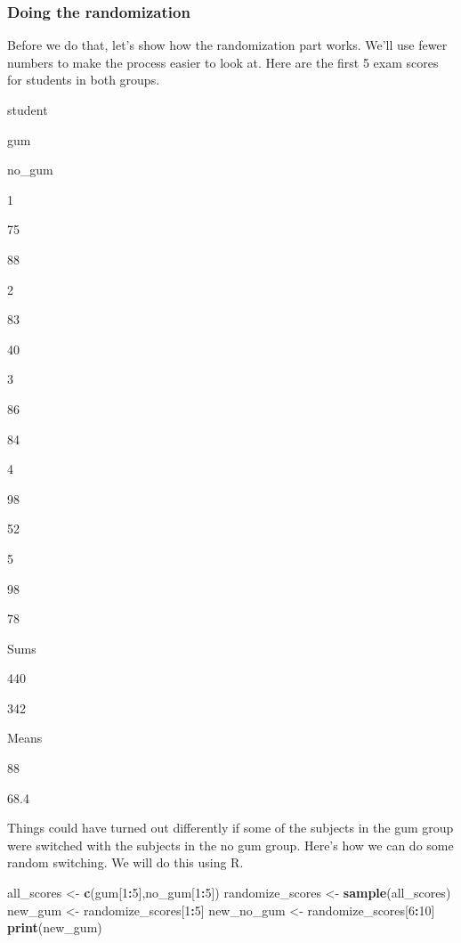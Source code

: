 \documentclass[
]{book}
\newenvironment{Shaded}{\begin{snugshade}}{\end{snugshade}}
\newcommand{\DecValTok}[1]{\textcolor[rgb]{0.00,0.00,0.81}{#1}}
\newcommand{\KeywordTok}[1]{\textcolor[rgb]{0.13,0.29,0.53}{\textbf{#1}}}
\newcommand{\NormalTok}[1]{#1}
\newcommand{\OperatorTok}[1]{\textcolor[rgb]{0.81,0.36,0.00}{\textbf{#1}}}
\newcommand{\StringTok}[1]{\textcolor[rgb]{0.31,0.60,0.02}{#1}}
\begin{document}
\hypertarget{doing-the-randomization}{%
\subsubsection{Doing the randomization}\label{doing-the-randomization}}

Before we do that, let's show how the randomization part works. We'll use fewer numbers to make the process easier to look at. Here are the first 5 exam scores for students in both groups.

student

gum

no\_gum

1

75

88

2

83

40

3

86

84

4

98

52

5

98

78

Sums

440

342

Means

88

68.4

Things could have turned out differently if some of the subjects in the gum group were switched with the subjects in the no gum group. Here's how we can do some random switching. We will do this using R.

\begin{Shaded}
\begin{Highlighting}[]
\NormalTok{all_scores       <-}\StringTok{ }\KeywordTok{c}\NormalTok{(gum[}\DecValTok{1}\OperatorTok{:}\DecValTok{5}\NormalTok{],no_gum[}\DecValTok{1}\OperatorTok{:}\DecValTok{5}\NormalTok{])}
\NormalTok{randomize_scores <-}\StringTok{ }\KeywordTok{sample}\NormalTok{(all_scores)}
\NormalTok{new_gum          <-}\StringTok{ }\NormalTok{randomize_scores[}\DecValTok{1}\OperatorTok{:}\DecValTok{5}\NormalTok{]}
\NormalTok{new_no_gum       <-}\StringTok{ }\NormalTok{randomize_scores[}\DecValTok{6}\OperatorTok{:}\DecValTok{10}\NormalTok{]}
\KeywordTok{print}\NormalTok{(new_gum)}
\end{Highlighting}
\end{Shaded}
\end{document}
